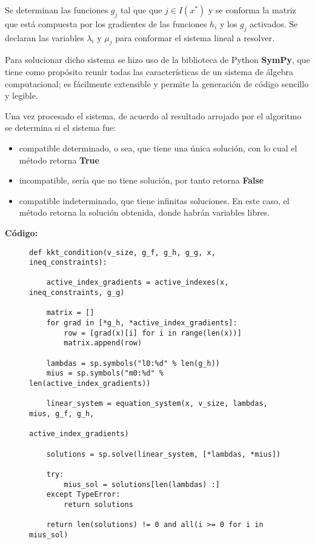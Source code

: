 \documentclass[titlepage, 11pt]{scrartcl}
\begin{document}
	Se determinan las funciones $g_j$ tal que que $j\in I(x^*)$ y se conforma la matriz que está compuesta por los gradientes de las funciones $h_i$ y los $g_j$ activados. Se declaran las variables $\lambda_i$ y $\mu_j$ para conformar el sistema lineal a resolver.
	
	Para solucionar dicho sistema se hizo uso de la biblioteca de Python \textbf{SymPy}, que tiene como propósito reunir todas las características de un sistema de álgebra computacional; es fácilmente extensible y permite la generación de código sencillo y legible.
	
	Una vez procesado el sistema, de acuerdo al resultado arrojado por el algoritmo se determina si el sistema fue:
	\begin{itemize}
		\item  compatible determinado, o sea, que tiene una única solución, con lo cual el método retorna \textbf{True}
		\item incompatible, sería que no tiene solución, por tanto retorna \textbf{False}
		\item compatible indeterminado, que tiene infinitas soluciones. En este caso, el método retorna la solución obtenida, donde habrán variables libres.
		
	\end{itemize}
	\vspace{7mm}
	\textbf{C\'odigo:}
	\begin{figure}[H]
		\begin{verbatim}
def kkt_condition(v_size, g_f, g_h, g_g, x, ineq_constraints):

	active_index_gradients = active_indexes(x, ineq_constraints, g_g)
	
	matrix = []
	for grad in [*g_h, *active_index_gradients]:
		row = [grad(x)[i] for i in range(len(x))]
		matrix.append(row)
		
	lambdas = sp.symbols("l0:%d" % len(g_h))
	mius = sp.symbols("m0:%d" % len(active_index_gradients))
		
	linear_system = equation_system(x, v_size, lambdas, mius, g_f, g_h,
									 active_index_gradients)
	
	solutions = sp.solve(linear_system, [*lambdas, *mius])

	try:
		mius_sol = solutions[len(lambdas) :]
	except TypeError:
		return solutions
	
	return len(solutions) != 0 and all(i >= 0 for i in mius_sol) 
		\end{verbatim}
		\label{code}
	\end{figure}
\end{document}
